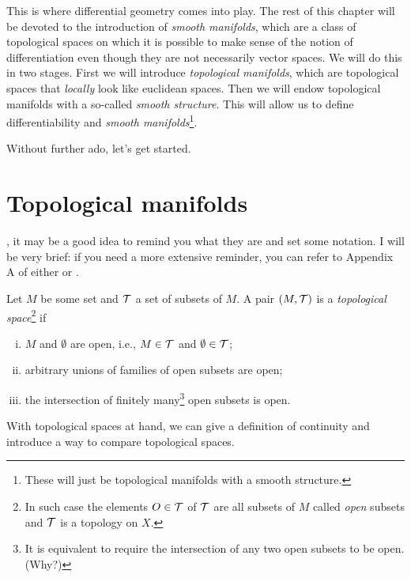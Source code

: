 This is where differential geometry comes into play.
The rest of this chapter will be devoted to the introduction of \emph{smooth manifolds}, which are a class of topological spaces on which it is possible to make sense of the notion of differentiation even though they are not necessarily vector spaces.
We will do this in two stages.
First we will introduce \emph{topological manifolds}, which are topological spaces that \emph{locally} look like euclidean spaces.
Then we will endow topological manifolds with a so-called \emph{smooth structure}.
This will allow us to define differentiability and \emph{smooth manifolds}\footnote{These will just be topological manifolds with a smooth structure.}.

Without further ado, let's get started.

\section{Topological manifolds}

, it may be a good idea to remind you what they are and set some notation.
I will be very brief: if you need a more extensive reminder, you can refer to Appendix A of either \cite{book:tu} or \cite{book:lee}.

\begin{definition}
  Let $M$ be some set and $\mathcal{T}$ a set of subsets of $M$.
  A pair $(M, \mathcal{T})$ is a \emph{topological space}\footnote{In such case the elements $O\in\mathcal{T}$ of $\mathcal{T}$ are all subsets of $M$ called \emph{open} subsets and $\mathcal{T}$ is a topology on $X$.} if
  \begin{enumerate}[(i)]
    \item $M$ and $\emptyset$ are open, i.e., $M\in \mathcal{T}$ and $\emptyset\in\mathcal{T}$;
    \item arbitrary unions of families of open subsets are open;
    \item the intersection of finitely many\footnote{It is equivalent to require the intersection of any two open subsets to be open. (Why?)} open subsets is open.
  \end{enumerate}
\end{definition}

With topological spaces at hand, we can give a definition of continuity and introduce a way to compare topological spaces.

